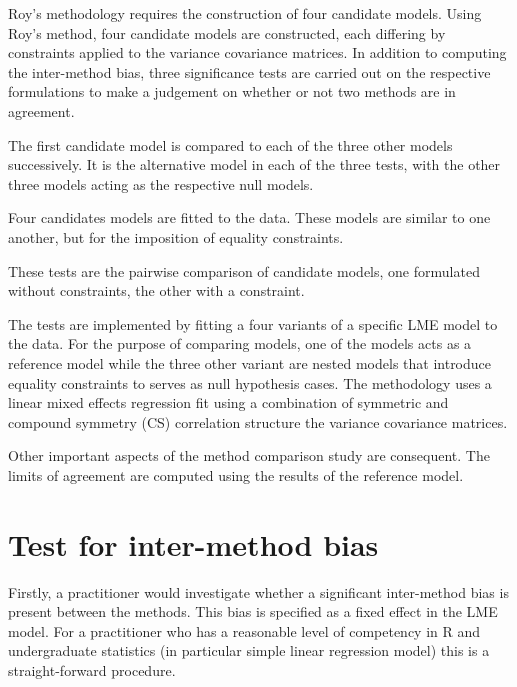 \documentclass[12pt, a4paper]{report}
\theoremstyle{plain}
\theoremstyle{definition}
\theoremstyle{remark}
\begin{document}
Roy's methodology requires the construction of four candidate models. 
Using Roy's method, four candidate models are constructed, each differing by constraints applied to the variance covariance matrices. In addition to computing the inter-method bias, three significance tests are carried out on the respective formulations to make a judgement on whether or not two methods are in agreement.

The first candidate model is compared to each of the three other models successively. It is the alternative model in each of the three tests, with the other three models acting as the respective null models.

Four candidates models are fitted to the data. These models are similar to one another, but for the imposition of equality constraints.

These tests are the pairwise comparison of candidate models, one formulated without constraints, the other with a constraint.

\bigskip
The tests are implemented by fitting a four variants of a specific LME model to the data. For the purpose of comparing models, one of the models acts as a reference model while the three other variant are nested models that introduce equality constraints to serves as null hypothesis cases. The methodology uses a linear mixed effects regression fit using a combination of symmetric and 
compound symmetry (CS) correlation structure the variance covariance matrices.

Other important aspects of the method comparison study are consequent. The limits of agreement are computed using the results of the reference model.




\section{Test for inter-method bias}

Firstly, a practitioner would investigate whether a significant inter-method bias is present between the methods. This bias is specified as a fixed effect in the LME model.  For a practitioner who has a reasonable level of competency in R and undergraduate statistics (in particular simple linear regression model) this is a straight-forward procedure.
\end{document}
